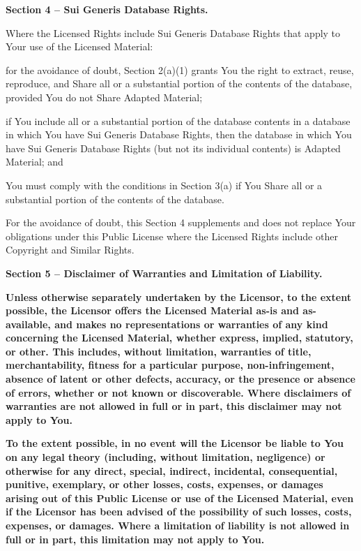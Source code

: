  \par \textbf{Section 4 – Sui Generis Database Rights.}
\par Where the Licensed Rights include Sui Generis Database Rights that apply to Your use of the Licensed Material:
\begin{doclicense@enumerate}
\item for the avoidance of doubt, Section 2(a)(1) grants You the right to extract, reuse, reproduce, and Share all or a substantial portion of the contents of the database, provided You do not Share Adapted Material;
\item if You include all or a substantial portion of the database contents in a database in which You have Sui Generis Database Rights, then the database in which You have Sui Generis Database Rights (but not its individual contents) is Adapted Material; and
\item You must comply with the conditions in Section 3(a) if You Share all or a substantial portion of the contents of the database.
\end{doclicense@enumerate}
For the avoidance of doubt, this Section 4 supplements and does not replace Your obligations under this Public License where the Licensed Rights include other Copyright and Similar Rights.
\par \textbf{Section 5 – Disclaimer of Warranties and Limitation of Liability.}
\begin{doclicense@enumerate}
\item \textbf{Unless otherwise separately undertaken by the Licensor, to the extent possible, the Licensor offers the Licensed Material as-is and as-available, and makes no representations or warranties of any kind concerning the Licensed Material, whether express, implied, statutory, or other. This includes, without limitation, warranties of title, merchantability, fitness for a particular purpose, non-infringement, absence of latent or other defects, accuracy, or the presence or absence of errors, whether or not known or discoverable. Where disclaimers of warranties are not allowed in full or in part, this disclaimer may not apply to You.}
\item \textbf{To the extent possible, in no event will the Licensor be liable to You on any legal theory (including, without limitation, negligence) or otherwise for any direct, special, indirect, incidental, consequential, punitive, exemplary, or other losses, costs, expenses, or damages arising out of this Public License or use of the Licensed Material, even if the Licensor has been advised of the possibility of such losses, costs, expenses, or damages. Where a limitation of liability is not allowed in full or in part, this limitation may not apply to You.}
\end{doclicense@enumerate}
